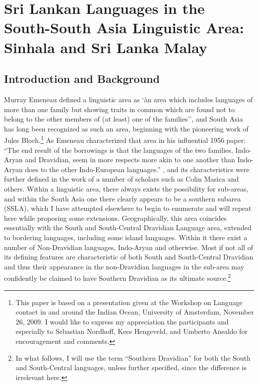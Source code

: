 \chapter[South-South Asian Linguistic Area]{Sri Lankan Languages in the South-South Asia Linguistic Area: Sinhala and Sri Lanka Malay}


\section{Introduction and Background}
Murray Emeneau defined a linguistic area as `àn area which includes languages of more than one family but showing traits in common which are found not to belong to the other members of (at least) one of the families'', and South Asia has long been recognized as such an area, beginning with the pioneering work of Jules Bloch.\footnote{This
  paper is based on a presentation given at the Workshop on Language contact in and around the Indian Ocean, University of Amsterdam, November 26, 2009. I would like to express my appreciation the participants and especially to Sebastian Nordhoff, Kees Hengeveld, and Umberto Ansaldo for encouragement and comments.}
 As Emeneau characterized that area in his influential 1956 paper: \nocite{Emeneau1956} ``The end result of the borrowings is that the languages of the two families, Indo-Aryan and Dravidian, seem in more respects more akin to one another than Indo-Aryan does to the other Indo-European languages.'' \citep[16]{Emeneau1956}, and its characteristics were further defined in the work of a number of scholars such as Colin Masica and others.
Within a linguistic area, there always exists the possibility for sub-areas, and within the South Asia one there clearly appears to be a southern subarea (SSLA), which I have attempted elsewhere to begin to enumerate \citep{Gair1994} and will repeat here while proposing some extensions. Geographically, this area coincides essentially with the South and South-Central Dravidian Language area, extended to bordering languages, including some island languages. Within it there exist a number of Non-Dravidian languages, Indo-Aryan and otherwise. Most if not all of its defining features are characteristic of both South and South-Central Dravidian and thus their appearance in the non-Dravidian languages in the sub-area may confidently be claimed to have Southern Dravidian as its ultimate source.\footnote{In
  what follows, I will use the term ``Southern Dravidian'' for both the South and South-Central languages, unless further specified, since the difference is irrelevant here.
}
